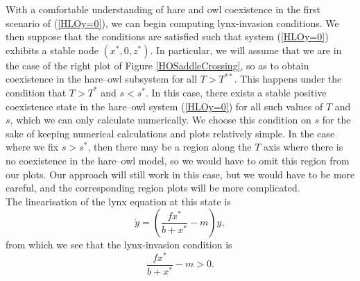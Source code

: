 \documentclass[12pt]{UOthesis}
\theoremstyle{remarkstyle}
\begin{document}
With a comfortable understanding of hare and owl coexistence in the first scenario of (\ref{HLOy=0}), we can begin computing lynx-invasion conditions. We then suppose that the conditions are satisfied such that system (\ref{HLOy=0}) exhibits a stable node $(x^*,0,z^*)$. In particular, we will assume that  we are in the case of the right plot of Figure \ref{HOSaddleCrossing}, so as to obtain coexistence in the hare--owl subsystem for all $T>T^{**}$. This happens under the condition that $T>T^*$ and $s<s^*$. In this case, there exists a stable positive coexistence state in the hare--owl system (\ref{HLOy=0}) for all such values of $T$ and $s$, which we can only calculate numerically. We choose this condition on $s$ for the sake of keeping numerical calculations and plots relatively simple. In the case where we fix $s>s^*$, then there may be a region along the $T$ axis where there is no coexistence in the hare--owl model, so we would have to omit this region from our plots. Our approach will still work in this case, but we would have to be more careful, and the corresponding region plots will be more complicated.\\

The linearisation of the lynx equation at this state is
$$\dot{y}=\left(\frac{fx^*}{b+x^*}-m\right)y,$$
from which we see that the lynx-invasion condition is
\begin{equation}
	\frac{fx^*}{b+x^*}-m>0.
	\label{HLOLynxInvCond}
\end{equation}
\end{document}
